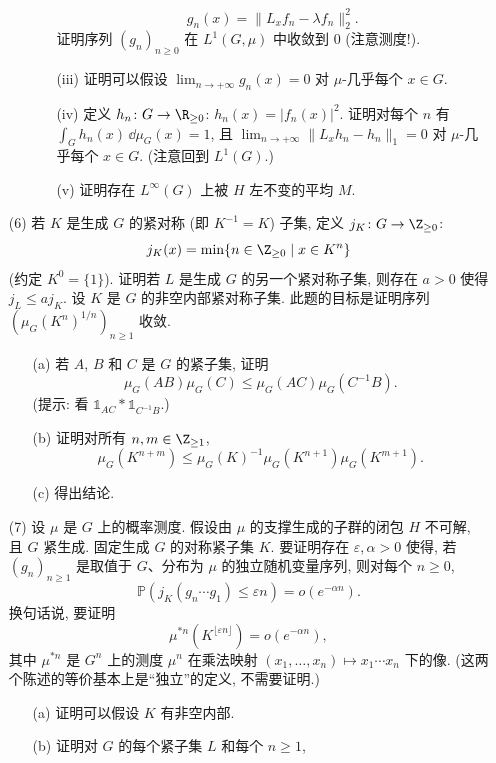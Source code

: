 \begin{enumerate}
\begin{enumerate}
\begin{enumerate}
\[      g_n(x) = \|L_xf_n - \lambda f_n\|_2^2.
      \]
      证明序列 $(g_n)_{n \geq 0}$ 在 $L^1(G, \mu)$ 中收敛到 $0$ (注意测度!).
    \item[(iii)] 证明可以假设 $\lim_{n \to +\infty}g_n(x) = 0$ 对 $\mu$-几乎每个 $x \in G$.
    \item[(iv)] 定义 $h_n \colon G \to \R_{\geq 0}$: $h_n(x) = |f_n(x)|^2$. 证明对每个 $n$ 有 $\int_G h_n(x)\,\dd\mu_G(x) = 1$, 且 $\lim_{n \to +\infty}\|L_xh_n - h_n\|_1 = 0$ 对 $\mu$-几乎每个 $x \in G$. (注意回到 $L^1(G)$.)
    \item[(v)] 证明存在 $L^{\infty}(G)$ 上被 $H$ 左不变的平均 $M$.
    \end{enumerate}
\end{enumerate}
\item[(6)] 若 $K$ 是生成 $G$ 的紧对称 (即 $K^{-1} = K$) 子集, 定义 $j_K \colon G \to \Z_{\geq 0}$:
  \[
  j_K(x) = \min\{n \in \Z_{\geq 0} \mid x \in K^n\}
  \]
  (约定 $K^0 = \{1\}$).
  证明若 $L$ 是生成 $G$ 的另一个紧对称子集, 则存在 $a > 0$ 使得 $j_L \leq aj_K$.
  设 $K$ 是 $G$ 的非空内部紧对称子集. 此题的目标是证明序列 $(\mu_G(K^n)^{1/n})_{n \geq 1}$ 收敛.
  \begin{enumerate}
  \item[(a)] 若 $A$, $B$ 和 $C$ 是 $G$ 的紧子集, 证明
    \[
    \mu_G(AB)\mu_G(C) \leq \mu_G(AC)\mu_G(C^{-1}B).
    \]
    (提示: 看 $\mathbb{1}_{AC} * \mathbb{1}_{C^{-1}B}$.)
  \item[(b)] 证明对所有 $n, m \in \Z_{\geq 1}$,
    \[
    \mu_G(K^{n+m}) \leq \mu_G(K)^{-1}\mu_G(K^{n+1})\mu_G(K^{m+1}).
    \]
  \item[(c)] 得出结论.
  \end{enumerate}
\item[(7)] 设 $\mu$ 是 $G$ 上的概率测度. 假设由 $\mu$ 的支撑生成的子群的闭包 $H$ 不可解, 且 $G$ 紧生成. 固定生成 $G$ 的对称紧子集 $K$. 要证明存在 $\varepsilon, \alpha > 0$ 使得, 若 $(g_n)_{n \geq 1}$ 是取值于 $G$、分布为 $\mu$ 的独立随机变量序列, 则对每个 $n \geq 0$,
  \[
  \mathbb{P}(j_K(g_n\cdots g_1) \leq \varepsilon n) = o(e^{-\alpha n}).
  \]
  换句话说, 要证明
  \[
  \mu^{*n}(K^{\lfloor \varepsilon n \rfloor}) = o(e^{-\alpha n}),
  \]
  其中 $\mu^{*n}$ 是 $G^n$ 上的测度 $\mu^n$ 在乘法映射 $(x_1, \ldots, x_n) \longmapsto x_1\cdots x_n$ 下的像. (这两个陈述的等价基本上是``独立''的定义, 不需要证明.)
  \begin{enumerate}
  \item[(a)] 证明可以假设 $K$ 有非空内部.
  \item[(b)] 证明对 $G$ 的每个紧子集 $L$ 和每个 $n \geq 1$,

\end{enumerate}
\end{enumerate}
